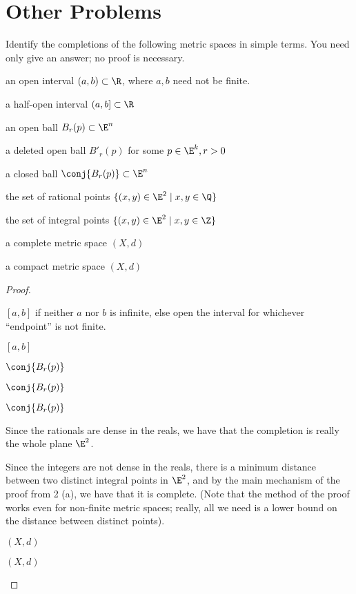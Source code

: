 \documentclass{assignment}
\begin{document}
\maketitle

\section*{Other Problems}
\begin{question}[1]
  Identify the completions of the following metric spaces in simple terms. You need only give an
answer; no proof is necessary.
\begin{qparts}
  \item an open interval $(a,b) \subset \R$, where $a,b$ need not be finite.
  \item a half-open interval $(a,b] \subset \R$
  \item an open ball $B_r(p) \subset \E^n$
  \item a deleted open ball $B'_r(p)$ for some $p\in\E^k, r > 0$
  \item a closed ball $\conj{B_r(p)} \subset \E^n$
  \item the set of rational points $\{(x,y) \in \E^2 \mid x,y \in \Q \}$
  \item the set of integral points $\{(x,y) \in \E^2 \mid x,y \in \Z \}$
  \item a complete metric space $(X, d)$
  \item a compact metric space $(X, d)$ 
\end{qparts} 
\end{question}
\begin{proof}\leavevmode
\begin{qparts}
  \item $[a,b]$ if neither $a$ nor $b$ is infinite, else open the interval for whichever ``endpoint''
is not finite.
  \item $[a,b]$
  \item $\conj{B_r(p)}$
  \item $\conj{B_r(p)}$
  \item $\conj{B_r(p)}$
  \item Since the rationals are dense in the reals, we have that the completion is really the whole 
plane $\E^2$. 
  \item Since the integers are not dense in the reals, there is a minimum distance between two distinct
integral points in $\E^2$, and by the main mechanism of the proof from 2 (a), we have that it is complete.
(Note that the method of the proof works even for non-finite metric spaces; really, all we need is a 
lower bound on the distance between distinct points).
  \item $(X,d)$
  \item $(X,d)$
\end{qparts}
\end{proof}
\end{document}
